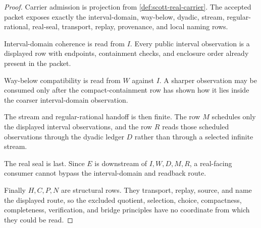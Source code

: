 \begin{proof}
Carrier admission is projection from \autoref{def:scott-real-carrier}. The accepted packet exposes exactly the interval-domain, way-below, dyadic, stream, regular-rational, real-seal, transport, replay, provenance, and local naming rows.

Interval-domain coherence is read from $I$. Every public interval observation is a displayed row with endpoints, containment checks, and enclosure order already present in the packet.

Way-below compatibility is read from $W$ against $I$. A sharper observation may be consumed only after the compact-containment row has shown how it lies inside the coarser interval-domain observation.

The stream and regular-rational handoff is then finite. The row $M$ schedules only the displayed interval observations, and the row $R$ reads those scheduled observations through the dyadic ledger $D$ rather than through a selected infinite stream.

The real seal is last. Since $E$ is downstream of $I,W,D,M,R$, a real-facing consumer cannot bypass the interval-domain and readback route.

Finally $H,C,P,N$ are structural rows. They transport, replay, source, and name the displayed route, so the excluded quotient, selection, choice, compactness, completeness, verification, and bridge principles have no coordinate from which they could be read.
\end{proof}

